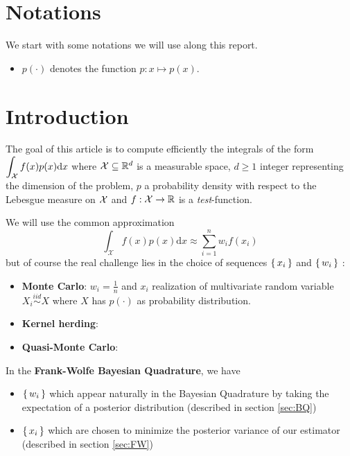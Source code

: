 \section*{Notations}
We start with some notations we will use along this report.
\begin{itemize}[font= \color{blue} \large, label= $\bullet$]
 \item $p(\cdot)$ denotes the function $p: x \mapsto p(x)$.
\end{itemize}

\section*{Introduction}

The goal of this article \cite{FWBQ} is to compute efficiently the integrals of the form
$ \displaystyle \int _ { \mathcal{X} } f ( x ) p ( x ) \mathrm { d } x$
where $\mathcal{X} \subseteq \mathbb{R} ^ { d }$ is a measurable space,
$d \geq 1$ integer representing the dimension of the problem, $p$ a probability
density with respect to the Lebesgue measure on $\mathcal{X}$ and $f : \mathcal{X} \rightarrow \mathbb{R}$
 is a \textit{test}-function.

 We will use the common approximation
 \begin{equation}
\int _ { \mathcal { X } } f ( x ) p ( x ) \mathrm { d } x \approx \sum _ { i = 1 } ^ { n } w _ { i } f \left( x _ { i } \right)
 \end{equation}
 but of course the real challenge lies in the choice of sequences $\left \{ \, x_i \, \right \}$ and
 $\left \{ \, w_i \, \right \}$ :
  \begin{itemize}[font= \color{blue} \large, label= $\bullet$]
    \item \textbf{Monte Carlo}: $w_i = \frac{1}{n}$ and $x_i$ realization of multivariate
    random variable $X_i \stackrel{iid}{\sim} X$ where $X$ has $p(\cdot)$ as probability
    distribution.
    \item \textbf{Kernel herding}:
    \item \textbf{Quasi-Monte Carlo}:
  \end{itemize}

  In the \textbf{Frank-Wolfe Bayesian Quadrature}, we have
  \begin{itemize}[font= \color{blue} \large, label= ]
\item $\left \{ \, w_i \, \right \}$ which appear naturally in the Bayesian Quadrature by taking the expectation of a posterior distribution  (described in section \ref{sec:BQ})
\item $\left \{ \, x_i \, \right \}$ which are chosen to minimize the posterior variance of our estimator
 (described in section \ref{sec:FW})
  \end{itemize}


